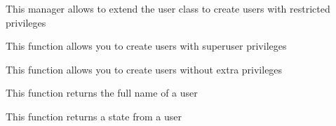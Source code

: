 \documentclass[letterpaper,10pt,english]{sphinxmanual}
\begin{document}
\begin{fulllineitems}
\label{modules/account:apps.account.models.UserManager}
This manager allows to extend the user class to create users with restricted privileges

\begin{fulllineitems}
\label{modules/account:apps.account.models.UserManager.create_superuser}
This function allows you to create users with superuser privileges

\end{fulllineitems}


\begin{fulllineitems}
\label{modules/account:apps.account.models.UserManager.create_user}
This function allows you to create users without extra privileges

\end{fulllineitems}


\begin{fulllineitems}
\label{modules/account:apps.account.models.UserManager.getFullName}
This function returns the full name of a user

\end{fulllineitems}


\end{fulllineitems}


\begin{fulllineitems}
\label{modules/account:apps.account.models.getStateUser}
This function returns a state from a user

\end{fulllineitems}

\end{document}
